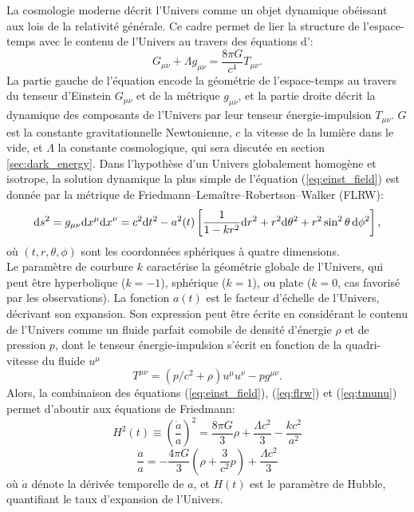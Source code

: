 La cosmologie moderne décrit l'Univers comme un objet dynamique obéissant aux lois de la relativité générale.
Ce cadre permet de lier la structure de l'espace-temps avec le contenu de l'Univers au travers des équations d':
\begin{equation}
    \label{eq:einst_field}
    G_{\mu\nu} + \Lambda g_{\mu\nu} = \frac{8\pi G}{c^4} T_{\mu\nu}.
\end{equation}
La partie gauche de l'équation encode la géométrie de l'espace-temps au travers du tenseur d'Einstein $G_{\mu\nu}$ et de la métrique $g_{\mu\nu}$, et la partie droite décrit la dynamique des composants de l'Univers par leur tenseur énergie-impulsion $T_{\mu\nu}$.
$G$ est la constante gravitationnelle Newtonienne, $c$ la vitesse de la lumière dans le vide, et $\Lambda$ la constante cosmologique, qui sera discutée en section \ref{sec:dark_energy}.
Dans l'hypothèse d'un Univers globalement homogène et isotrope, la solution dynamique la plus simple de l'équation (\ref{eq:einst_field}) est donnée par la métrique de Friedmann–Lemaître–Robertson–Walker (FLRW):
\begin{equation}
    \label{eq:flrw}
    \mathrm{d} s^2 = g_{\mu\nu} \mathrm{d} x^\mu \mathrm{d} x^\nu = c^2 \mathrm{d} t^2 - a^2(t) \left[ \frac{1}{1 - kr^2} \mathrm{d} r^2 + r^2 \mathrm{d}\theta^2 + r^2 \sin^2\theta \, \mathrm{d}\phi^2 \right],
\end{equation}
où $(t, r, \theta, \phi)$ sont les coordonnées sphériques à quatre dimensions. \\
Le paramètre de courbure $k$ caractérise la géométrie globale de l'Univers, qui peut être hyperbolique ($k=-1$), sphérique ($k=1$), ou plate ($k=0$, cas favorisé par les observations).
La fonction $a(t)$ est le facteur d'échelle de l'Univers, décrivant son expansion.
Son expression peut être écrite en considérant le contenu de l'Univers comme un fluide parfait comobile de densité d'énergie $\rho$ et de pression $p$, dont le tenseur énergie-impulsion s'écrit en fonction de la quadri-vitesse du fluide $u^\mu$
\begin{equation}
    \label{eq:tmunu}
    T^{\mu\nu} = (p/c^2 + \rho)u^\mu u^\nu - p g^{\mu\nu}.
\end{equation}
Alors, la combinaison des équations (\ref{eq:einst_field}), (\ref{eq:flrw}) et (\ref{eq:tmunu}) permet d'aboutir aux équations de Friedmann:
\begin{equation}
    \label{eq:fried1}
    H^2(t) \equiv \left(\frac{\dot{a}}{a}\right)^2 = \frac{8\pi G}{3} \rho + \frac{\Lambda c^2}{3} - \frac{kc^2}{a^2}
\end{equation}
\begin{equation}
    \label{eq:fried2}
    \frac{\ddot{a}}{a} = -\frac{4\pi G}{3} \left(\rho + \frac{3}{c^2} p\right) + \frac{\Lambda c^2}{3}
\end{equation}
où $\dot{a}$ dénote la dérivée temporelle de $a$, et $H(t)$ est le paramètre de Hubble, quantifiant le taux d'expansion de l'Univers.

